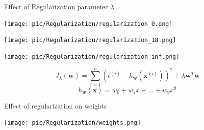 \documentclass[serif, aspectratio=169]{beamer}
\begin{document}
\begin{frame}{Effect of Regularization parameter \( \lambda \)}
    \begin{minipage}{0.32\textwidth}
        \centering
        \texttt{[image: pic/Regularization/regularization\_0.png]}
    \end{minipage} %
    \begin{minipage}{0.32\textwidth}
        \centering
        \texttt{[image: pic/Regularization/regularization\_18.png]}
    \end{minipage} %
    \begin{minipage}{0.32\textwidth}
        \centering
        \texttt{[image: pic/Regularization/regularization\_inf.png]}
    \end{minipage}
    \vfill
    \[
    J_{\lambda}(\mathbf{w}) = \sum_{i=1}^n \left( t^{(i)} - h_{\mathbf{w}}(\mathbf{x}^{(i)}) \right)^2 + \lambda \mathbf{w}^T\mathbf{w}
    \]
    \[ 
    h_{\mathbf{w}}(\mathbf{x}) = w_0 + w_1 x + \dots + w_9 x^9
    \]
    \vfill
\end{frame}

\begin{frame}{Effect of regularization on weights}
    \begin{minipage}{0.9\textwidth}
        \centering
        \texttt{[image: pic/Regularization/weights.png]}
    \end{minipage}
    \vfill
\end{frame}
\end{document}
